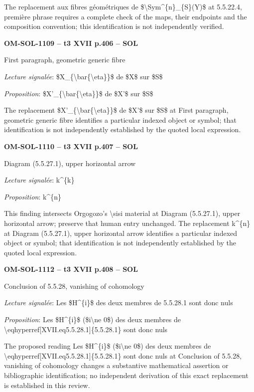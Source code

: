 The replacement aux fibres géométriques de \$\textbackslash{}Sym\textasciicircum{}\{n\}\_\{S\}(Y)\$ at 5.5.22.4, première phrase requires a complete check of the maps, their endpoints and the composition convention; this identification is not independently verified.\par
\par\noindent\textbf{OM-SOL-1109 -- t3 XVII p.406 -- SOL}\par
First paragraph, geometric generic fibre\par
\emph{Lecture signalée}: \$X\_\{\textbackslash{}bar\{\textbackslash{}eta\}\}\$ de \$X\$ sur \$S\$\par
\emph{Proposition}: \$X'\_\{\textbackslash{}bar\{\textbackslash{}eta\}\}\$ de \$X'\$ sur \$S\$\par
The replacement \$X'\_\{\textbackslash{}bar\{\textbackslash{}eta\}\}\$ de \$X'\$ sur \$S\$ at First paragraph, geometric generic fibre identifies a particular indexed object or symbol; that identification is not independently established by the quoted local expression.\par
\par\noindent\textbf{OM-SOL-1110 -- t3 XVII p.407 -- SOL}\par
Diagram (5.5.27.1), upper horizontal arrow\par
\emph{Lecture signalée}: k\textasciicircum{}\{k\}\par
\emph{Proposition}: k\textasciicircum{}\{n\}\par
This finding intersects Orgogozo's \textbackslash{}sisi material at Diagram (5.5.27.1), upper horizontal arrow; preserve that human entry unchanged. The replacement k\textasciicircum{}\{n\} at Diagram (5.5.27.1), upper horizontal arrow identifies a particular indexed object or symbol; that identification is not independently established by the quoted local expression.\par
\par\noindent\textbf{OM-SOL-1112 -- t3 XVII p.408 -- SOL}\par
Conclusion of 5.5.28, vanishing of cohomology\par
\emph{Lecture signalée}: Les \$H\textasciicircum{}\{i\}\$ des deux membres de 5.5.28.1 sont donc nuls\par
\emph{Proposition}: Les \$H\textasciicircum{}\{i\}\$ (\$i\textbackslash{}ne 0\$) des deux membres de \textbackslash{}eqhyperref[XVII.eq5.5.28.1]\{5.5.28.1\} sont donc nuls\par
The proposed reading Les \$H\textasciicircum{}\{i\}\$ (\$i\textbackslash{}ne 0\$) des deux membres de \textbackslash{}eqhyperref[XVII.eq5.5.28.1]\{5.5.28.1\} sont donc nuls at Conclusion of 5.5.28, vanishing of cohomology changes a substantive mathematical assertion or bibliographic identification; no independent derivation of this exact replacement is established in this review.\par
